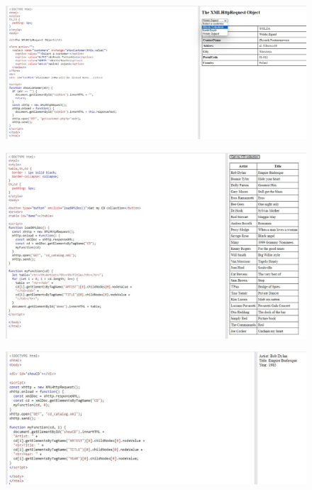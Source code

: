 \documentclass{article}
\begin{document}
\begin{itemize}
\begin{figure}[H]
		\end{figure}
		\begin{figure}[H]
			\centering
			\includegraphics[width=1.0\textwidth,keepaspectratio]{img/A18.jpg}
		\end{figure}
		\begin{figure}[H]
			\centering
			\includegraphics[width=1.0\textwidth,keepaspectratio]{img/A19.jpg}
		\end{figure}
		\begin{figure}[H]
			\centering
			\includegraphics[width=1.0\textwidth,keepaspectratio]{img/A20.jpg}
		\end{figure}


\end{itemize}
\end{document}
